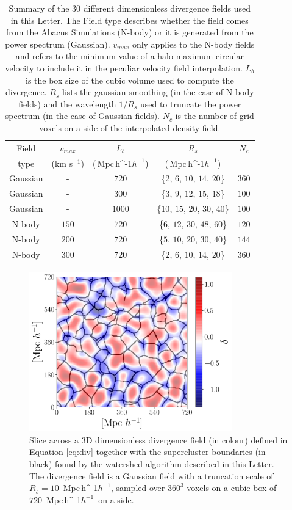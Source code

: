 \documentclass[usenatbib]{mnras}
\newcommand{\Mpch}{\,{\rm Mpc}\,\ifmmode h^{-1}\else $h^{-1}$\fi}
\begin{document}
\begin{table}
\begin{tabular}{c c c c c}\hline
Field &  $v_{max}$ & $L_b$ & $R_s$ & $N_c$\\
type & (km s$^{-1}$) & (\Mpch) & (\Mpch) & \\\hline
Gaussian & - & $720$ & \{$2$, $6$, $10$, $14$, $20$\} & $360$\\
Gaussian & - & $300$ & \{$3$, $9$, $12$, $15$, $18$\} & $100$\\
Gaussian & - & $1000$ & \{$10$, $15$, $20$, $30$, $40$\} & $100$\\
N-body & $150$ & $720$ & \{$6$, $12$, $30$, $48$, $60$\} & $120$\\
N-body & $200$ & $720$ & \{$5$, $10$, $20$, $30$, $40$\} & $144$\\
N-body & $300$ & $720$ & \{$2$, $6$, $10$, $14$, $20$\} & $360$\\\hline
\end{tabular}
\caption{Summary of the $30$ different dimensionless divergence fields used in this Letter. 
The Field type describes whether the field comes from the Abacus Simulations (N-body) or it is generated from the power spectrum (Gaussian). $v_{max}$ only applies to the N-body fields and refers to the minimum value of a halo maximum circular velocity to include it in the peculiar velocity field interpolation.
$L_b$ is the box size of the cubic volume used to compute the divergence. $R_{s}$ lists the gaussian smoothing (in the case of N-body fields) and the wavelength $1/R_s$ used to truncate the power spectrum (in the case of Gaussian fields). $N_c$ is the number of grid voxels on a side of the interpolated density field.}
\label{table:values}
\end{table}


\begin{figure}
    \centering
    \includegraphics[width=250pt]{example_watershed.pdf}
    \caption{Slice across a 3D dimensionless divergence field (in colour) defined in Equation \ref{eq:div} together with the supercluster boundaries (in black) found by the watershed algorithm described in this Letter. 
    The divergence field is a Gaussian field with a truncation scale of $R_s=10$ \Mpch, sampled over $360^3$ voxels on a cubic box of $720$ \Mpch\ on a side.
    \label{fig:illustration}}
\end{figure}
\end{document}
